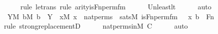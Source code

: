 \begin{isabellebody}
\ \ \ \ \isamarkupfalse%
{\isacharparenleft}{\kern0pt}rule\ le{\isacharunderscore}{\kern0pt}trans{\isacharcomma}{\kern0pt}\ rule\ arity{\isacharunderscore}{\kern0pt}is{\isacharunderscore}{\kern0pt}Fn{\isacharunderscore}{\kern0pt}perm{\isacharprime}{\kern0pt}{\isacharunderscore}{\kern0pt}fm{\isacharparenright}{\kern0pt}\isanewline
\ \ \ \ \isamarkupfalse%
\ Un{\isacharunderscore}{\kern0pt}least{\isacharunderscore}{\kern0pt}lt\isanewline
\ \ \ \ \isamarkupfalse%
\ auto\isanewline
\isanewline
\ \ \isamarkupfalse%
\ \isamarkupfalse%
\ {\isachardoublequoteopen}{\isasymexists}Y{\isacharbrackleft}{\kern0pt}{\isacharhash}{\kern0pt}{\isacharhash}{\kern0pt}M{\isacharbrackright}{\kern0pt}{\isachardot}{\kern0pt}\ {\isasymforall}b{\isacharbrackleft}{\kern0pt}{\isacharhash}{\kern0pt}{\isacharhash}{\kern0pt}M{\isacharbrackright}{\kern0pt}{\isachardot}{\kern0pt}\ b\ {\isasymin}\ Y\ {\isasymlongleftrightarrow}\ {\isacharparenleft}{\kern0pt}{\isasymexists}x{\isacharbrackleft}{\kern0pt}{\isacharhash}{\kern0pt}{\isacharhash}{\kern0pt}M{\isacharbrackright}{\kern0pt}{\isachardot}{\kern0pt}\ x\ {\isasymin}\ nat{\isacharunderscore}{\kern0pt}perms\ {\isasymand}\ sats{\isacharparenleft}{\kern0pt}M{\isacharcomma}{\kern0pt}\ is{\isacharunderscore}{\kern0pt}Fn{\isacharunderscore}{\kern0pt}perm{\isacharprime}{\kern0pt}{\isacharunderscore}{\kern0pt}fm{\isacharparenleft}{\kern0pt}{}{\isacharcomma}{\kern0pt}\ {}{\isacharcomma}{\kern0pt}\ {}{\isacharparenright}{\kern0pt}{\isacharcomma}{\kern0pt}\ {\isacharbrackleft}{\kern0pt}x{\isacharcomma}{\kern0pt}\ b{\isacharbrackright}{\kern0pt}\ {\isacharat}{\kern0pt}\ {\isacharbrackleft}{\kern0pt}Fn{\isacharbrackright}{\kern0pt}{\isacharparenright}{\kern0pt}{\isacharparenright}{\kern0pt}{\isachardoublequoteclose}\ \isanewline
\ \ \ \ \isamarkupfalse%
{\isacharparenleft}{\kern0pt}rule\ strong{\isacharunderscore}{\kern0pt}replacementD{\isacharparenright}{\kern0pt}\isanewline
\ \ \ \ \isamarkupfalse%
\ nat{\isacharunderscore}{\kern0pt}perms{\isacharunderscore}{\kern0pt}in{\isacharunderscore}{\kern0pt}M\ {\isacartoucheopen}{\isacharquery}{\kern0pt}C{\isacartoucheclose}\isanewline
\ \ \ \ \isamarkupfalse%
\ auto\isanewline
\ \ \isamarkupfalse%
\ \isamarkupfalse%

\end{isabellebody}
